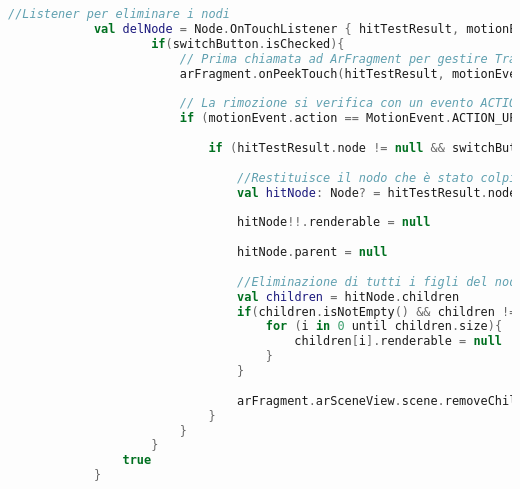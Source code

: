 \documentclass[crop=false, class=book]{standalone}
\begin{document}
	\begin{center}
		\begin{minipage}{0.95\textwidth}
			\begin{lstlisting}[caption={Eliminazione di un nodo dalla scena in Plane Detection}, label={lst: delete-node}, language=Kotlin]
			//Listener per eliminare i nodi
			val delNode = Node.OnTouchListener { hitTestResult, motionEvent ->
					if(switchButton.isChecked){
						// Prima chiamata ad ArFragment per gestire TrasformableNode
						arFragment.onPeekTouch(hitTestResult, motionEvent)
						
						// La rimozione si verifica con un evento ACTION UP
						if (motionEvent.action == MotionEvent.ACTION_UP) {
							
							if (hitTestResult.node != null && switchButton.isChecked) {
								
								//Restituisce il nodo che è stato colpito dal hitTest
								val hitNode: Node? = hitTestResult.node
								
								hitNode!!.renderable = null
								
								hitNode.parent = null
								
								//Eliminazione di tutti i figli del nodo
								val children = hitNode.children
								if(children.isNotEmpty() && children != null){
									for (i in 0 until children.size){
										children[i].renderable = null
									}
								}
							
								arFragment.arSceneView.scene.removeChild(hitNode)
							}
						}
					}
				true
			}
			\end{lstlisting}
		\end{minipage}
	\end{center}
	
			
	
\end{document}
